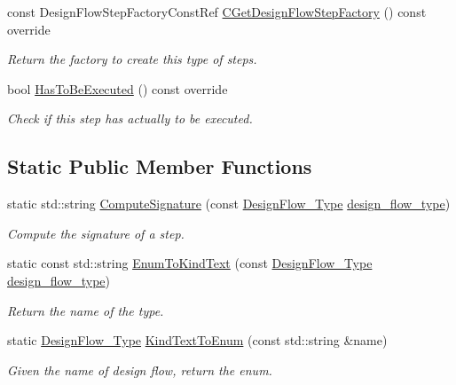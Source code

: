 \begin{DoxyCompactItemize}
const Design\+Flow\+Step\+Factory\+Const\+Ref \hyperlink{classDesignFlow_a5c46b102b9346c38c5a85a1841588bda}{C\+Get\+Design\+Flow\+Step\+Factory} () const override
\begin{DoxyCompactList}\small\item\em Return the factory to create this type of steps. \end{DoxyCompactList}\item 
bool \hyperlink{classDesignFlow_ac0c4f316f0ecf8f3b4a040e0a700616c}{Has\+To\+Be\+Executed} () const override
\begin{DoxyCompactList}\small\item\em Check if this step has actually to be executed. \end{DoxyCompactList}\end{DoxyCompactItemize}
\subsection*{Static Public Member Functions}
\begin{DoxyCompactItemize}
\item 
static std\+::string \hyperlink{classDesignFlow_ad4a2c9611b98f3d5108be5ad71a8de63}{Compute\+Signature} (const \hyperlink{design__flow_8hpp_a0701ad2cbf08dc97b38caee3bbbff0c0}{Design\+Flow\+\_\+\+Type} \hyperlink{classDesignFlow_a5774fa7fbbd7935123f6705578fe50b0}{design\+\_\+flow\+\_\+type})
\begin{DoxyCompactList}\small\item\em Compute the signature of a step. \end{DoxyCompactList}\item 
static const std\+::string \hyperlink{classDesignFlow_ad561ebde784b2bd0afd84a526a19a836}{Enum\+To\+Kind\+Text} (const \hyperlink{design__flow_8hpp_a0701ad2cbf08dc97b38caee3bbbff0c0}{Design\+Flow\+\_\+\+Type} \hyperlink{classDesignFlow_a5774fa7fbbd7935123f6705578fe50b0}{design\+\_\+flow\+\_\+type})
\begin{DoxyCompactList}\small\item\em Return the name of the type. \end{DoxyCompactList}\item 
static \hyperlink{design__flow_8hpp_a0701ad2cbf08dc97b38caee3bbbff0c0}{Design\+Flow\+\_\+\+Type} \hyperlink{classDesignFlow_a489bafa0366d812deb15424b54d822c9}{Kind\+Text\+To\+Enum} (const std\+::string \&name)
\begin{DoxyCompactList}\small\item\em Given the name of design flow, return the enum. \end{DoxyCompactList}\end{DoxyCompactItemize}
